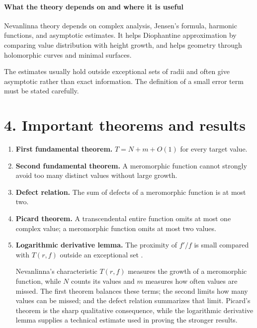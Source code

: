 \paragraph{What the theory depends on and where it is useful}
Nevanlinna theory depends on complex analysis, Jensen's formula, harmonic functions, and asymptotic estimates. It helps Diophantine approximation by comparing value distribution with height growth, and helps geometry through holomorphic curves and minimal surfaces.

The estimates usually hold outside exceptional sets of radii and often give asymptotic rather than exact information. The definition of a small error term must be stated carefully.

\section*{4. Important theorems and results}
\begin{enumerate}[leftmargin=*,itemsep=0.35em]
\item \textbf{First fundamental theorem.} $T=N+m+O(1)$ for every target value.

\item \textbf{Second fundamental theorem.} A meromorphic function cannot strongly avoid too many distinct values without large growth.

\item \textbf{Defect relation.} The sum of defects of a meromorphic function is at most two.

\item \textbf{Picard theorem.} A transcendental entire function omits at most one complex value; a meromorphic function omits at most two values.

\item \textbf{Logarithmic derivative lemma.} The proximity of $f'/f$ is small compared with $T(r,f)$ outside an exceptional set \cite{nevanlinna_theory_ref3}.

Nevanlinna's characteristic $T(r,f)$ measures the growth of a meromorphic function, while $N$ counts its values and $m$ measures how often values are missed. The first theorem balances these terms; the second limits how many values can be missed; and the defect relation summarizes that limit. Picard's theorem is the sharp qualitative consequence, while the logarithmic derivative lemma supplies a technical estimate used in proving the stronger results.
\end{enumerate}

